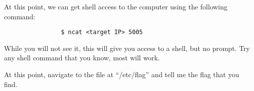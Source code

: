 			At this point, we can get shell access to the computer using the following command:
			\begin{verbatim}
				$ ncat <target IP> 5005
			\end{verbatim}
			While you will not see it, this will give you access to a shell, but no prompt.
			Try any shell command that you know, most will work.

			At this point, navigate to the file at ``/etc/flag'' and tell me the flag that you find.

